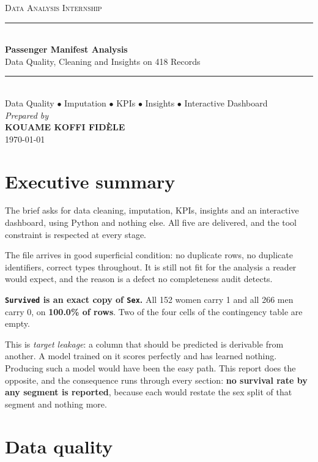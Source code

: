 \documentclass[12pt,a4paper]{article}
\newcommand{\F}[1]{\texttt{\small #1}}
\begin{document}
\begin{titlepage}\centering
\vspace*{3cm}
{\large\scshape Data Analysis Internship}\\[2.6cm]
\rule{\linewidth}{0.5pt}\\[0.8cm]
{\LARGE\bfseries Passenger Manifest Analysis}\\[0.6cm]
{\large Data Quality, Cleaning and Insights on 418 Records}\\[0.8cm]
\rule{\linewidth}{0.5pt}\\[1.2cm]
{\normalsize Data Quality $\bullet$ Imputation $\bullet$ KPIs $\bullet$ Insights
$\bullet$ Interactive Dashboard}\\[3.2cm]
{\large\itshape Prepared by}\\[0.5cm]
{\Large\bfseries KOUAME KOFFI FID\`ELE}\\[0.6cm]
{\large \today}
\vfill\end{titlepage}

\tableofcontents\newpage

\section{Executive summary}

The brief asks for data cleaning, imputation, KPIs, insights and an interactive
dashboard, using Python and nothing else. All five are delivered, and the tool
constraint is respected at every stage.

The file arrives in good superficial condition: no duplicate rows, no duplicate
identifiers, correct types throughout. It is still not fit for the analysis a reader
would expect, and the reason is a defect no completeness audit detects.

\textbf{\F{Survived} is an exact copy of \F{Sex}.} All 152 women
carry 1 and all 266 men carry 0, on \textbf{100.0\% of
rows}. Two of the four cells of the contingency table are empty.

This is \emph{target leakage}: a column that should be predicted is derivable from
another. A model trained on it scores perfectly and has learned nothing. Producing
such a model would have been the easy path. This report does the opposite, and the
consequence runs through every section: \textbf{no survival rate by any segment is
reported}, because each would restate the sex split of that segment and nothing more.

\section{Data quality}
\end{document}
